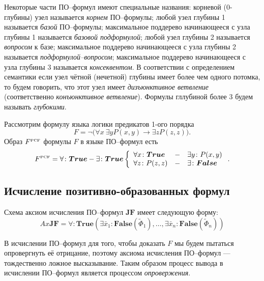 
Некоторые части ПО--формул имеют специальные названия: корневой (0-глубины) узел называется {\em корнем} ПО--формулы; любой узел глубины 1 называется {\em базой} ПО--формулы; максимальное поддерево начинающееся с узла глубины 1 называется {\em базовой подформулой}; любой узел глубины 2 называется {\em вопросом} к базе; максимальное поддерево начинающееся с узла глубины 2 называется {\em подформулой--вопросом}; максимальное поддерево начинающееся с узла глубины 3 называется {\em консеквентом}. В соответствии с определением семантики если узел чётной (нечетной) глубины имеет более чем одного потомка, то будем говорить, что этот узел имеет {\em дизъюнктивное ветвление} (соответственно {\em конъюнктивное ветвление}). Формулы гллубиной более 3 будем называть {\em глубокими}.

\begin{example}
Рассмотрим формулу языка логики предикатов 1-ого порядка
$$F= \neg\bigl(\forall x\:\exists y P(x,y)\rightarrow \exists z P(z,z)\bigr).$$
Образ $F^{\text{\tiny{PCF}}}$ формулы $F$ в языке ПО--формул есть
$$F^{\text{\tiny{PCF}}} = \forall\colon \boldsymbol{True}-\exists\colon\boldsymbol{True} \left\{
\begin{array}{lcl}
 \forall x\colon\boldsymbol{True} & - & \exists y\colon P(x,y) \\
 \forall z\colon P(z,z) & - & \exists\colon\boldsymbol{False}
\end{array}
\right..$$

\end{example}


\subsection{Исчисление позитивно-образованных формул}

Схема аксиом исчисления ПО--формул $\boldsymbol{JF}$ имеет следующую форму:
$$ Ax\boldsymbol{JF} = \forall\colon\boldsymbol{True}\left(\exists \bar{x}_1\colon\boldsymbol{False}\left(\widetilde{\Phi}_1\right),\ldots,\exists \bar{x}_n\colon\boldsymbol{False}\left(\widetilde{\Phi}_n\right)\right) $$

В исчислении ПО--формул для того, чтобы доказать $F$ мы будем пытаться опровергнуть её отрицание, поэтому аксиома исчисления ПО--формул ---  тождественно ложное высказывание. Таким образом процесс вывода в исчислении ПО--формул является процессом {\em опровержения}. 

